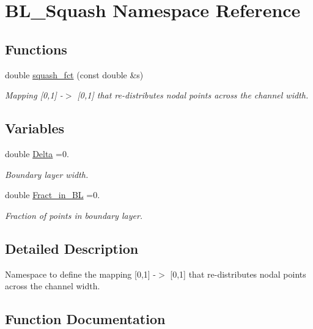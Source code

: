 \hypertarget{namespaceBL__Squash}{}\section{B\+L\+\_\+\+Squash Namespace Reference}
\label{namespaceBL__Squash}
\subsection*{Functions}
\begin{DoxyCompactItemize}
\item 
double \hyperlink{namespaceBL__Squash_a0fdaf7661591150041b7102dbe578cdc}{squash\+\_\+fct} (const double \&s)
\begin{DoxyCompactList}\small\item\em Mapping \mbox{[}0,1\mbox{]} -\/$>$ \mbox{[}0,1\mbox{]} that re-\/distributes nodal points across the channel width. \end{DoxyCompactList}\end{DoxyCompactItemize}
\subsection*{Variables}
\begin{DoxyCompactItemize}
\item 
double \hyperlink{namespaceBL__Squash_a3c4183891049bca81f3a011db24fc579}{Delta} =0.
\begin{DoxyCompactList}\small\item\em Boundary layer width. \end{DoxyCompactList}\item 
double \hyperlink{namespaceBL__Squash_af84bda39008884cd2b01e630957573df}{Fract\+\_\+in\+\_\+\+BL} =0.
\begin{DoxyCompactList}\small\item\em Fraction of points in boundary layer. \end{DoxyCompactList}\end{DoxyCompactItemize}


\subsection{Detailed Description}
Namespace to define the mapping \mbox{[}0,1\mbox{]} -\/$>$ \mbox{[}0,1\mbox{]} that re-\/distributes nodal points across the channel width. 

\subsection{Function Documentation}
\mbox{\label{namespaceBL__Squash_a0fdaf7661591150041b7102dbe578cdc}} 
